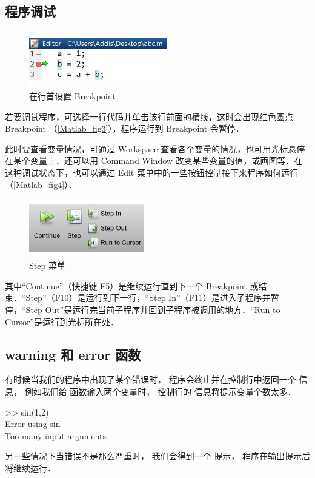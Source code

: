 

\subsection{程序调试}
\begin{figure}[ht]
\centering
\includegraphics[width= 6cm]{./figures/Matlab3.pdf}
\caption{在行首设置 Breakpoint}\label{Matlab_fig3}
\end{figure}

若要调试程序，可选择一行代码并单击该行前面的横线，这时会出现红色圆点 Breakpoint （\autoref{Matlab_fig3}），程序运行到 Breakpoint 会暂停．

此时要查看变量情况，可通过 Workspace 查看各个变量的情况，也可用光标悬停在某个变量上．还可以用 Command Window 改变某些变量的值，或画图等．在这种调试状态下，也可以通过 Edit 菜单中的一些按钮控制接下来程序如何运行（\autoref{Matlab_fig4}）．
\begin{figure}[ht]
\centering
\includegraphics[width= 5cm]{./figures/Matlab4.pdf}
\caption{Step 菜单}\label{Matlab_fig4}
\end{figure}
其中“Continue”（快捷键 F5）是继续运行直到下一个 Breakpoint 或结束．“Step”（F10）是运行到下一行，“Step In”（F11）是进入子程序并暂停，“Step Out”是运行完当前子程序并回到子程序被调用的地方．“Run to Cursor”是运行到光标所在处．

\subsection{warning 和 error 函数}
有时候当我们的程序中出现了某个错误时， 程序会终止并在控制行中返回一个  信息， 例如我们给  函数输入两个变量时， 控制行的  信息将提示变量个数太多．
\begin{Command}
>> sin(1,2)\\
{\color{error}Error using \underline{sin}\\
Too many input arguments.}
\end{Command}
另一些情况下当错误不是那么严重时， 我们会得到一个  提示， 程序在输出提示后将继续运行．

